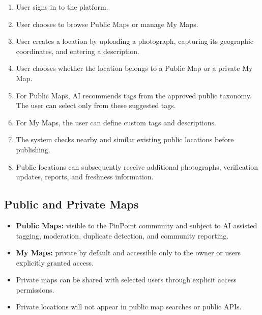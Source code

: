 \documentclass[11pt,a4paper]{article}
\begin{document}
\begin{enumerate}[leftmargin=0.7cm]
    \item User signs in to the platform.
    
    \item User chooses to browse Public Maps or manage My Maps.
    
    \item User creates a location by uploading a photograph, capturing its
    geographic coordinates, and entering a description.
    
    \item User chooses whether the location belongs to a Public Map or a
    private My Map.
    
    \item For Public Maps, AI recommends tags from the approved public
    taxonomy. The user can select only from these suggested tags.
    
    \item For My Maps, the user can define custom tags and descriptions.
    
    \item The system checks nearby and similar existing public locations
    before publishing.
    
    \item Public locations can subsequently receive additional photographs,
    verification updates, reports, and freshness information.
\end{enumerate}

\subsection{Public and Private Maps}

\begin{itemize}[leftmargin=0.7cm]
    \item \textbf{Public Maps:} visible to the PinPoint community and subject
    to AI assisted tagging, moderation, duplicate detection, and community
    reporting.
    
    \item \textbf{My Maps:} private by default and accessible only to the
    owner or users explicitly granted access.
    
    \item Private maps can be shared with selected users through explicit
    access permissions.
    
    \item Private locations will not appear in public map searches or public
    APIs.
\end{itemize}
\end{document}
